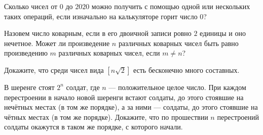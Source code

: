 \documentclass{article}
\begin{document}
\begin{enumerate_boxed}
        Сколько чисел от $0$ до $2020$ можно получить с помощью одной или нескольких таких операций, если изначально на калькуляторе горит число $0$?

        \item Назовем число коварным, если в его двоичной записи ровно $2$ единицы и оно нечетное.
        Может ли произведение $n$ различных коварных чисел быть равно произведению $m$ различных коварных чисел, если $m \neq n$?

        \item Докажите, что среди чисел вида $[{n\sqrt{2}}]$ есть бесконечно много составных.

        \item В шеренге стоят $2^n$ солдат, где $n$ — положительное целое число.
        При каждом перестроении в начало новой шеренги встают солдаты, до этого стоявшие на нечётных местах (в том же порядке), а за ними — солдаты, до этого стоявшие на чётных местах (в том же порядке).
        Докажите, что по прошествии $n$ перестроений солдаты окажутся в таком же порядке, с которого начали.

    \end{enumerate_boxed}
\end{document}
